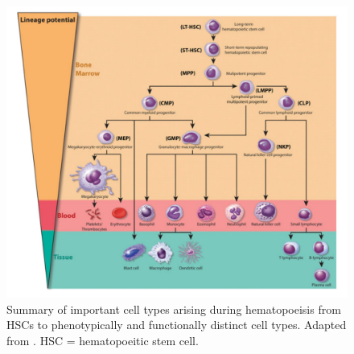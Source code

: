 \begin{figure}
  \centering
  \includegraphics[width=\textwidth]{plot/ch4/hem.pdf}
  \caption[Hematopoiesis schematic]{Summary of important cell types arising during hematopoeisis from HSCs to phenotypically and functionally distinct cell types. Adapted from \textcite{Hu2016}. HSC = hematopoeitic stem cell.}
  \label{fig:hem_sum}
\end{figure}

